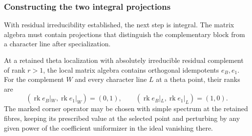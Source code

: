 \subsubsection*{Constructing the two integral projections}

With residual irreducibility established, the next step is integral. The matrix algebra must contain projections that distinguish the complementary block from a character line after specialization.

\begin{proposition}\label{prop:retained-integral-projections}
At a retained theta localization with absolutely irreducible
residual complement of rank \(r>1\), the local matrix algebra contains orthogonal idempotents \(e_B,e_1\). For the complement \(W\) and every character line \(L\) at a theta point, their ranks are
\[
 (\operatorname{rk}e_B|_W,\operatorname{rk}e_1|_W)=(0,1),\qquad (\operatorname{rk}e_B|_L,\operatorname{rk}e_1|_L)=(1,0).
\]
The marked corner operator may be chosen with simple spectrum at
the retained fibres, keeping its prescribed value at the selected
point and perturbing by any given power of the coefficient uniformizer
in the ideal vanishing there.
\end{proposition}

